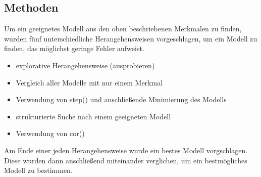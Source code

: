 \subsection{Methoden}
\label{sec:met}
Um ein geeignetes Modell aus den oben beschriebenen Merkmalen zu finden, wurden f\"unf unterschiedliche Herangehensweisen vorgeschlagen, um ein Modell zu finden, das m\"oglichst geringe Fehler aufweist.
\begin{itemize}
	\item explorative Herangehensweise (ausprobieren)
	\item Vergleich aller Modelle mit nur einem Merkmal
	\item Verwendung von step() und anschlie\ss{}ende Minimierung des Modells
	\item strukturierte Suche nach einem geeigneten Modell
	\item Verwendung von cor()
\end{itemize}
Am Ende einer jeden Herangehensweise wurde ein bestes Modell vorgschlagen. Diese wurden dann anschlie\ss{}end miteinander verglichen, um ein bestm\"ogliches Modell zu bestimmen.
\par\smallskip

